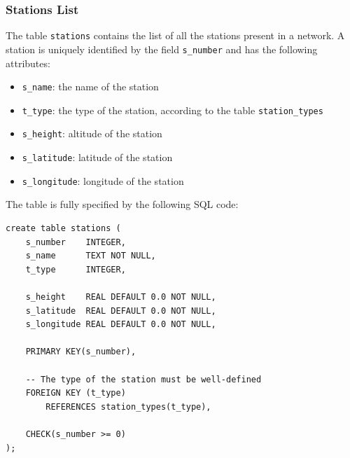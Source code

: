 \subsubsection{Stations List}
The table \texttt{stations} contains the list of all the stations present in a
network. A station is uniquely identified by the field \texttt{s\_number} and has
the following attributes:
\begin{itemize}
    \item \texttt{s\_name}: the name of the station
    \item \texttt{t\_type}: the type of the station, according to the table \texttt{station\_types} 
    \item \texttt{s\_height}: altitude of the station
    \item \texttt{s\_latitude}: latitude of the station
    \item \texttt{s\_longitude}: longitude of the station
\end{itemize}

The table is fully specified by the following SQL code:
\begin{verbatim}
create table stations (
    s_number    INTEGER,
    s_name      TEXT NOT NULL,
    t_type      INTEGER,

    s_height    REAL DEFAULT 0.0 NOT NULL,
    s_latitude  REAL DEFAULT 0.0 NOT NULL,
    s_longitude REAL DEFAULT 0.0 NOT NULL,

    PRIMARY KEY(s_number),
    
    -- The type of the station must be well-defined
    FOREIGN KEY (t_type)
        REFERENCES station_types(t_type),
    
    CHECK(s_number >= 0)
);
\end{verbatim}

